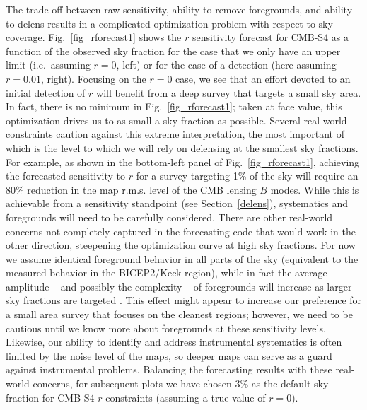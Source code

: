The trade-off between raw sensitivity, ability to remove foregrounds, and ability to delens results in a complicated optimization problem with respect to sky coverage.
Fig.~\ref{fig_rforecast1} shows the $r$ sensitivity forecast for CMB-S4 as a function of the observed sky fraction for the case that we only have an upper limit (i.e.\ assuming $r=0$, left) or for the case of a detection (here assuming $r=0.01$, right).
Focusing on the $r=0$ case, we see that an effort devoted to an initial detection of $r$ will benefit from a deep survey that targets a small sky area.
In fact, there is no minimum in Fig.~\ref{fig_rforecast1}; taken at face value, this optimization drives us to as small a sky fraction as possible. 
Several real-world constraints caution against this extreme interpretation, the most important of which is the level to which we will rely on delensing at the smallest sky fractions.
For example, as shown in the bottom-left panel of Fig.~\ref{fig_rforecast1}, achieving the forecasted sensitivity to $r$ for a survey targeting 1\% of the sky will require an 80\% reduction in the map r.m.s. level of the CMB lensing $B$ modes. 
While this is achievable from a sensitivity standpoint (see Section~\ref{delens}), systematics and foregrounds will need to be carefully considered.
There are other real-world concerns not completely captured in the forecasting code that would work in the other direction, steepening the optimization curve at high sky fractions.
For now we assume identical foreground behavior in all parts of the sky (equivalent to the measured behavior in the BICEP2/Keck region), while in fact the average amplitude -- and possibly the complexity -- of foregrounds will increase as larger sky fractions are targeted \cite{Adam:2014bub,Aghanim:2016cps}.
This effect might appear to increase our preference for a small area survey that focuses on the cleanest regions; however, we need to be cautious until we know more about foregrounds at these sensitivity levels.
Likewise, our ability to identify and address instrumental systematics is often limited by the noise level of the maps, so deeper maps can serve as a guard against instrumental problems.
Balancing the forecasting results with these real-world concerns, for subsequent plots we have chosen 3\% as the default sky fraction for CMB-S4 $r$ constraints (assuming a true value of $r=0$).

